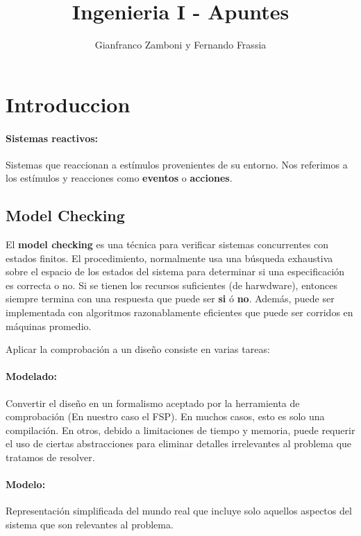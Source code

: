 






\title{Ingenieria I - Apuntes}
\author{Gianfranco Zamboni y Fernando Frassia}

	
\maketitle
\tableofcontents
\newpage
\section{Introduccion}
\paragraph{Sistemas reactivos:} Sistemas que reaccionan a estímulos provenientes de su entorno. Nos referimos a los estímulos y reacciones como \textbf{eventos} o \textbf{acciones}.


\subsection{Model Checking}
El \textbf{model checking} es una técnica para verificar sistemas concurrentes con estados finitos. El procedimiento, normalmente usa una búsqueda exhaustiva sobre el espacio de los estados del sistema para determinar si una especificación es correcta o no. Si se tienen los recursos suficientes (de harwdware), entonces siempre termina con una respuesta que puede ser \textbf{si} ó \textbf{no}. Además, puede ser implementada con algoritmos razonablamente eficientes que puede ser corridos en máquinas promedio. 

Aplicar la comprobación a un diseño consiste en varias tareas:

\paragraph{Modelado:} Convertir el diseño en un formalismo aceptado por la herramienta de comprobación (En nuestro caso el FSP). En muchos casos, esto es solo una compilación. En otros, debido a limitaciones de tiempo y memoria, puede requerir el uso de ciertas abstracciones para eliminar detalles irrelevantes al problema que tratamos de resolver.


\paragraph{Modelo:} Representación simplificada del mundo real que incluye solo aquellos aspectos del sistema que son relevantes al problema.

